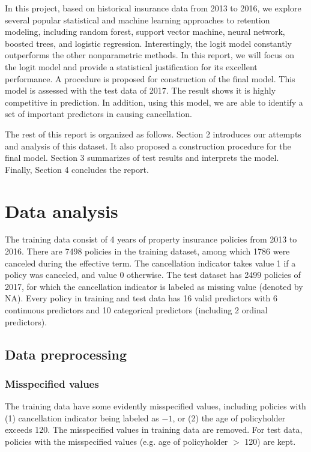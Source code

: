 \documentclass[12pt]{amsart}
\theoremstyle{definition}
\theoremstyle{remark}
\numberwithin{equation}{section}
\begin{document}
In this project, based on historical insurance data from 2013 to 2016, we explore several popular statistical and machine learning approaches to retention modeling, including random forest, support vector machine, neural network, boosted trees, and logistic regression. Interestingly, the logit model constantly outperforms the other nonparametric methods. In this report, we will focus on the logit model and provide a statistical justification for its excellent performance. A procedure is proposed for construction of the final model. This model is assessed with the test data of 2017. The result shows it is highly competitive in prediction. In addition, using this model, we are able to identify a set of important predictors in causing cancellation.

The rest of this report is organized as follows. 
Section 2 introduces our attempts and analysis of this dataset. 
It also proposed a construction procedure for the final model. 
Section 3 summarizes of test results and interprets the model. 
Finally, Section 4 concludes the report. 


\section{Data analysis}

The training data consist of 4 years of property insurance policies from 2013 to 2016. There are 7498 policies in the training dataset, among which 1786 were canceled during the effective term. The cancellation indicator takes value 1 if a policy was canceled, and value 0 otherwise. 
The test dataset has 2499 policies of 2017, for which the cancellation indicator is labeled as missing value (denoted by NA). Every policy in training and test data has 16 valid predictors with 6 continuous predictors and 10 categorical predictors (including 2 ordinal predictors). 

\subsection{Data preprocessing}

\subsubsection{Misspecified values}

The training data have some evidently misspecified values, including policies with (1) cancellation indicator being labeled as $-1$, or (2) the age of policyholder exceeds 120. The misspecified values in training data are removed. For test data, policies with the misspecified values (e.g. age of policyholder $>$ 120) are kept. 
\end{document}
